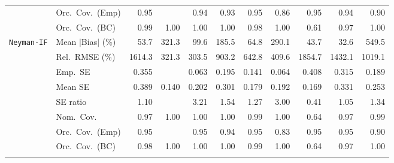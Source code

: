 \begin{landscape}
\begin{longtable}{llrrrrrrrrr}
 & Orc.\ Cov.\ (Emp) & \cellcolor{rankone}0.95 &  & \cellcolor{ranktwo}0.94 & \cellcolor{rankthree}0.93 & \cellcolor{rankone}0.95 & 0.86 & \cellcolor{rankone}0.95 & \cellcolor{ranktwo}0.94 & 0.90 \\
 & Orc.\ Cov.\ (BC) & \cellcolor{rankthree}0.99 & 1.00 & 1.00 & 1.00 & \cellcolor{ranktwo}0.98 & 1.00 & 0.61 & \cellcolor{rankone}0.97 & 1.00 \\
\addlinespace[2pt]
\quad \texttt{Neyman-IF} & Mean $|$Bias$|$ (\%) & \cellcolor{rankthree}53.7 & 321.3 & 99.6 & 185.5 & 64.8 & 290.1 & \cellcolor{ranktwo}43.7 & \cellcolor{rankone}32.6 & 549.5 \\
 & Rel.\ RMSE (\%) & 1614.3 & \cellcolor{ranktwo}321.3 & \cellcolor{rankone}303.5 & 903.2 & 642.8 & \cellcolor{rankthree}409.6 & 1854.7 & 1432.1 & 1019.1 \\
 & Emp.\ SE & 0.355 &  & 0.063 & 0.195 & 0.141 & 0.064 & 0.408 & 0.315 & 0.189 \\
 & Mean SE & 0.389 & 0.140 & 0.202 & 0.301 & 0.179 & 0.192 & 0.169 & 0.331 & 0.253 \\
 & SE ratio & \cellcolor{ranktwo}1.10 &  & 3.21 & 1.54 & \cellcolor{rankthree}1.27 & 3.00 & 0.41 & \cellcolor{rankone}1.05 & 1.34 \\
 & Nom.\ Cov. & \cellcolor{rankone}0.97 & \cellcolor{rankthree}1.00 & \cellcolor{rankthree}1.00 & \cellcolor{rankthree}1.00 & \cellcolor{ranktwo}0.99 & \cellcolor{rankthree}1.00 & 0.64 & \cellcolor{rankone}0.97 & \cellcolor{ranktwo}0.99 \\
 & Orc.\ Cov.\ (Emp) & \cellcolor{rankone}0.95 &  & \cellcolor{rankone}0.95 & \cellcolor{ranktwo}0.94 & \cellcolor{rankone}0.95 & 0.83 & \cellcolor{rankone}0.95 & \cellcolor{rankone}0.95 & \cellcolor{rankthree}0.90 \\
 & Orc.\ Cov.\ (BC) & \cellcolor{ranktwo}0.98 & 1.00 & 1.00 & 1.00 & \cellcolor{rankthree}0.99 & 1.00 & 0.64 & \cellcolor{rankone}0.97 & 1.00 \\
\addlinespace[2pt]
\end{longtable}
\end{landscape}
